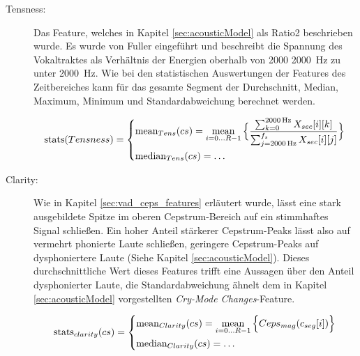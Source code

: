 \begin{description}
\item[Tensness:] Das Feature, welches in Kapitel \ref{sec:acousticModel} als \glqq Ratio2\grqq{} beschrieben wurde. Es wurde von Fuller \cite{threeCryTypes} eingeführt und beschreibt die Spannung des Vokaltraktes als Verhältnis der Energien oberhalb von 2000 \SI{2000}{\hertz} zu unter \SI{2000}{\hertz}. Wie bei den statistischen Auswertungen der Features des Zeitbereiches kann für das gesamte Segment der Durchschnitt, Median, Maximum, Minimum und Standardabweichung berechnet werden.

\begin{equation}
\text{stats}(Tensness) = 
\begin{dcases}
\text{mean}_{Tens}(cs) = \operatorname*{mean}_{i=0\ldots R-1} \Big\{ \frac{\sum_{k=0}^{\SI{2000}{\hertz}} X_{sec}[i][k]}{\sum_{j=\SI{2000}{\hertz}}^{f_{s}} X_{sec}[i][j]} \Big\} \\
\text{median}_{Tens}(cs) = \ldots
\end{dcases}
\end{equation}

\item[Clarity: ] Wie in Kapitel \ref{sec:vad_ceps_features} erläutert wurde, lässt eine stark ausgebildete Spitze im oberen Cepstrum-Bereich auf ein stimmhaftes Signal schließen. Ein hoher Anteil stärkerer Cepstrum-Peaks lässt also auf vermehrt phonierte Laute schließen, geringere Cepstrum-Peaks auf dysphoniertere Laute (Siehe Kapitel \ref{sec:acousticModel}). Dieses durchschnittliche Wert dieses Features trifft eine Aussagen über den Anteil dysphonierter Laute, die Standardabweichung ähnelt dem in Kapitel \ref{sec:acousticModel} vorgestellten \emph{Cry-Mode Changes}-Feature.

\begin{equation}
\text{stats}_{clarity}(cs) = 
\begin{dcases}
\text{mean}_{Clarity}(cs) = \operatorname*{mean}_{i=0\ldots R-1} \Big\{ Ceps_{mag}(c_{seg}[i])  \Big\} \\
\text{median}_{Clarity}(cs) = \ldots
\end{dcases}
\end{equation}
	
	
\end{description}

